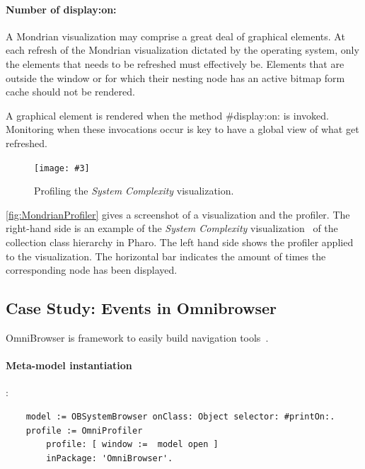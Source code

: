 \documentclass[runningheads]{llncs}
\newcommand{\project}{{\sc MetaSpy}\xspace}
\newcommand{\ct}{\lstinline[backgroundcolor=\color{white},basicstyle=\footnotesize\ttfamily]}
\newcommand{\fig}[4]{
	\begin{figure}[#1]
		\centering
		\texttt{[image: \#3]}
		\caption{\label{fig:#3}#4}
	\end{figure}}
\begin{document}
\paragraph{Number of display:on:}
A Mondrian visualization may comprise a great deal of graphical elements. At each refresh of the Mondrian visualization dictated by the operating system, only the elements that needs to be refreshed must effectively be. Elements that are outside the window or for which their nesting node has an active bitmap form cache should not be rendered. 

A graphical element is rendered when the method {\sf \#display:on:} is invoked. Monitoring when these invocations occur is key to have a global view of what get refreshed. 
%
%
%
\fig{}{.8}{MondrianProfiler}{Profiling the \emph{System Complexity} visualization.}

\autoref{fig:MondrianProfiler} gives a screenshot of a visualization and the profiler. The right-hand side is an example of the \emph{System Complexity} visualization~\cite{Lanz03d} of the collection class hierarchy in Pharo. The left hand side shows the profiler applied to the visualization. The horizontal bar indicates the amount of times the corresponding node has been displayed. %


\subsection{Case Study: Events in Omnibrowser}

OmniBrowser is framework to easily build navigation tools~\cite{Berg08c}. 

\paragraph{Meta-model instantiation}:
\begin{lstlisting}
	model := OBSystemBrowser onClass: Object selector: #printOn:.
	profile := OmniProfiler 
		profile: [ window :=  model open ]
		inPackage: 'OmniBrowser'.
\end{lstlisting}
\end{document}
